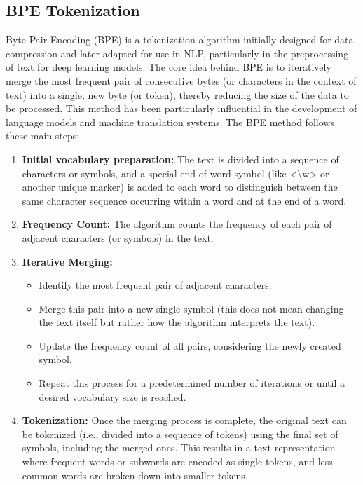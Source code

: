 \subsection{{BPE Tokenization}}\label{app:vocabulary}


Byte Pair Encoding (BPE) is a tokenization algorithm initially designed for data compression and later adapted for use in NLP, particularly in the preprocessing of text for deep learning models. The core idea behind BPE is to iteratively merge the most frequent pair of consecutive bytes (or characters in the context of text) into a single, new byte (or token), thereby reducing the size of the data to be processed. This method has been particularly influential in the development of language models and machine translation systems. 
The BPE method follows these main steps: 
\begin{enumerate}
    \item \textbf{Initial vocabulary preparation: }The text is divided into a sequence of characters or symbols, and a special end-of-word symbol (like <\textbackslash w> or another unique marker) is added to each word to distinguish between the same character sequence occurring within a word and at the end of a word.
    \item \textbf{Frequency Count: } The algorithm counts the frequency of each pair of adjacent characters (or symbols) in the text.
    \item \textbf{Iterative Merging: }
    \begin{itemize}
        \item Identify the most frequent pair of adjacent characters.
        \item Merge this pair into a new single symbol (this does not mean changing the text itself but rather how the algorithm interprets the text).
        \item Update the frequency count of all pairs, considering the newly created symbol.
        \item Repeat this process for a predetermined number of iterations or until a desired vocabulary size is reached.
    \end{itemize}
    \item \textbf{Tokenization: } Once the merging process is complete, the original text can be tokenized (i.e., divided into a sequence of tokens) using the final set of symbols, including the merged ones. This results in a text representation where frequent words or subwords are encoded as single tokens, and less common words are broken down into smaller tokens.
\end{enumerate}

